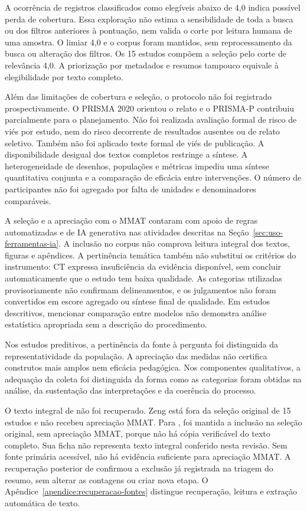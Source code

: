 A ocorrência de registros classificados como elegíveis abaixo de 4,0 indica possível perda de cobertura. Essa exploração não estima a sensibilidade de toda a busca ou dos filtros anteriores à pontuação, nem valida o corte por leitura humana de uma amostra. O limiar 4,0 e o corpus foram mantidos, sem reprocessamento da busca ou alteração dos filtros. Os 15 estudos compõem a seleção pelo corte de relevância 4,0. A priorização por metadados e resumos tampouco equivale à elegibilidade por texto completo.

Além das limitações de cobertura e seleção, o protocolo não foi registrado prospectivamente. O PRISMA 2020 orientou o relato e o PRISMA-P contribuiu parcialmente para o planejamento. Não foi realizada avaliação formal de risco de viés por estudo, nem do risco decorrente de resultados ausentes ou de relato seletivo. Também não foi aplicado teste formal de viés de publicação. A disponibilidade desigual dos textos completos restringe a síntese. A heterogeneidade de desenhos, populações e métricas impediu uma síntese quantitativa conjunta e a comparação de eficácia entre intervenções. O número de participantes não foi agregado por falta de unidades e denominadores comparáveis.

A seleção e a apreciação com o MMAT contaram com apoio de regras automatizadas e de IA generativa nas atividades descritas na Seção~\ref{sec:uso-ferramentas-ia}. A inclusão no corpus não comprova leitura integral dos textos, figuras e apêndices. A pertinência temática também não substitui os critérios do instrumento: CT expressa insuficiência da evidência disponível, sem concluir automaticamente que o estudo tem baixa qualidade. As categorias utilizadas provisoriamente não confirmam delineamentos, e os julgamentos não foram convertidos em escore agregado ou síntese final de qualidade. Em estudos descritivos, mencionar comparação entre modelos não demonstra análise estatística apropriada sem a descrição do procedimento.

Nos estudos preditivos, a pertinência da fonte à pergunta foi distinguida da representatividade da população. A apreciação das medidas não certifica construtos mais amplos nem eficácia pedagógica. Nos componentes qualitativos, a adequação da coleta foi distinguida da forma como as categorias foram obtidas na análise, da sustentação das interpretações e da coerência do processo.

O texto integral de  não foi recuperado. Zeng está fora da seleção original de 15 estudos e não recebeu apreciação MMAT. Para , foi mantida a inclusão na seleção original, sem apreciação MMAT, porque não há cópia verificável do texto completo. Sua ficha não representa texto integral conferido nesta revisão. Sem fonte primária acessível, não há evidência suficiente para apreciação MMAT. A recuperação posterior de  confirmou a exclusão já registrada na triagem do resumo, sem alterar as contagens ou criar nova etapa. O Apêndice~\ref{apendice:recuperacao-fontes} distingue recuperação, leitura e extração automática de texto.

